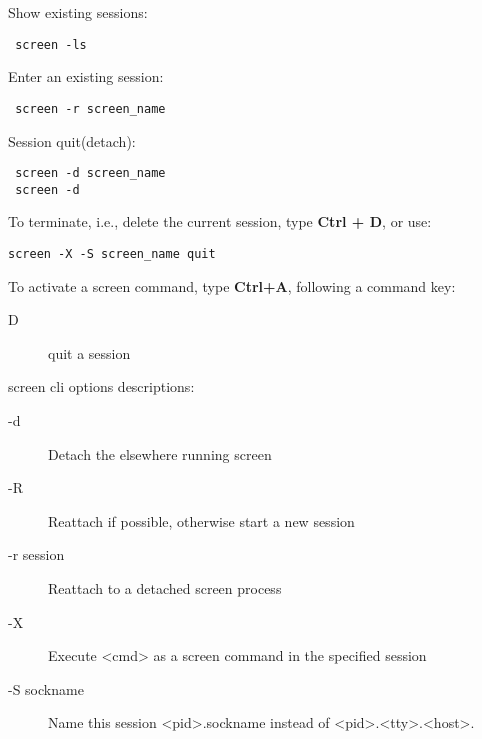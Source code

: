 Show existing sessions:

\begin{verbatim}
 screen -ls
\end{verbatim}
 

Enter an existing session:

\begin{verbatim}
 screen -r screen_name
\end{verbatim}
 
 
Session quit(detach):
\begin{verbatim}
 screen -d screen_name
 screen -d 
\end{verbatim}

To terminate, i.e., delete the current session, type \textbf{Ctrl + D}, or use:
\begin{verbatim}
screen -X -S screen_name quit 
\end{verbatim}



To activate a screen command, type \textbf{Ctrl+A}, following a command key:

\begin{description}
\item[D] quit a session
\end{description}


screen cli options descriptions:

\begin{description}
\item[-d] Detach the elsewhere running screen
\item[-R] Reattach if possible, otherwise start a new session
\item[-r session] Reattach to a detached screen process
\item[-X] Execute <cmd> as a screen command in the specified session
\item[-S sockname]   Name this session <pid>.sockname instead of <pid>.<tty>.<host>.
\end{description}












